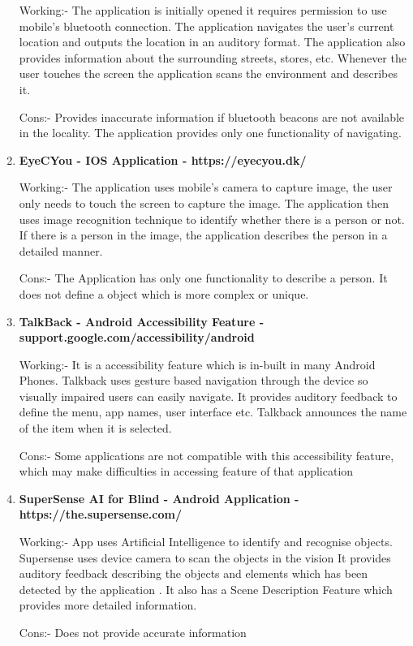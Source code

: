 \documentclass[MScCS]{uccthesis}
\begin{document}
\begin{enumerate}
Working:-
The application is initially opened it requires permission to use mobile's bluetooth connection.
The application navigates the user's current location and outputs the location in an auditory format.
The application also provides information about the surrounding streets, stores, etc.
Whenever the user touches the screen the application scans the environment and describes it.

Cons:-
Provides inaccurate information if bluetooth beacons are not available in the locality.
The application provides only one functionality of navigating.

\item \textbf{EyeCYou - IOS Application - https://eyecyou.dk/}

Working:-
The application uses mobile's camera to capture image, the user only needs to touch the screen to capture the image.
The application then uses image recognition technique to identify whether there is a person or not.
If there is a person in the image, the application describes the person in a detailed manner.

Cons:-
The Application has only one functionality to describe a person.
It does not define a object which is more complex or unique.

\item\textbf{TalkBack - Android Accessibility Feature - support.google.com/accessibility/android}

Working:-
It is a accessibility feature which is in-built in many Android Phones.
Talkback uses gesture based navigation through the device so visually impaired users can easily navigate.
It provides auditory feedback to define the menu, app names, user interface etc.
Talkback announces the name of the item when it is selected.

Cons:-
Some applications are not compatible with this accessibility feature, which may make difficulties in accessing feature of that application

\item \textbf{SuperSense AI for Blind - Android Application - https://the.supersense.com/}

Working:-
App uses Artificial Intelligence to identify and recognise objects.
Supersense uses device camera to scan the objects in the vision
It provides auditory feedback describing the objects and elements which has been detected by the application .
It also has a Scene Description Feature which provides more detailed information.

Cons:-
Does not provide accurate information


\end{enumerate}
\end{document}
